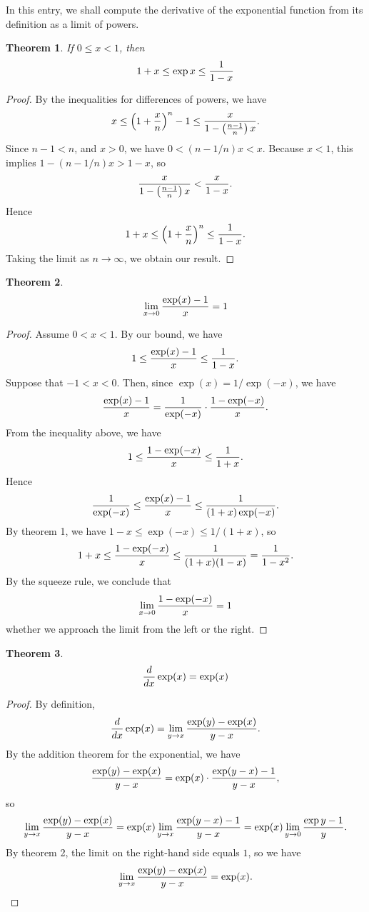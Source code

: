 \documentclass[12pt]{article}
\newtheorem{thm}{Theorem}
\begin{document}
In this entry, we shall compute the derivative of the exponential
function from its definition as a limit of powers.

\begin{thm}
If $0 \le x < 1$, then
\[
1 + x \le \exp x \le {1 \over 1-x}
\]
\end{thm}

\begin{proof}
By the inequalities for differences of powers, we have
\[
x \le 
\left( 1 + {x \over n} \right)^n - 1 \le 
{x \over 1 - \left( {n-1 \over n} \right) x} .
\]
Since $n-1 < n$, and $x > 0$, we have $0 < (n-1 / n) x < x$.  Because
$x < 1$, this implies $1 - (n-1 / n) x > 1 - x$, so
\[
{x \over 1 - \left( {n-1 \over n} \right) x} <
{x \over 1 - x}.
\]
Hence 
\[
1 + x \le \left( 1 + {x \over n} \right)^n \le {1 \over 1 - x}.
\]
Taking the limit as $n \to \infty$, we obtain our result.
\end{proof}

\begin{thm}
\[
\lim_{x \to 0} {\exp (x) - 1 \over x} = 1
\]
\end{thm}

\begin{proof}
Assume $0 < x < 1$.  By our bound, we have
\[
1 \le
{\exp (x) - 1 \over x} \le
{1 \over 1 - x} .
\]
Suppose that $-1 < x < 0$.  Then, since $\exp (x) = 1 / \exp (-x)$, we have
\[
{\exp (x) - 1 \over x} =
{1 \over \exp (-x)} \cdot {1 - \exp (-x) \over x} .
\]
From the inequality above, we have
\[
1 \le
{1 - \exp (-x) \over x} \le
{1 \over 1+x} .
\]
Hence
\[
{1 \over \exp (-x)} \le
{\exp (x) - 1 \over x} \le
{1 \over (1+x) \exp (-x)}.
\]
By theorem 1, we have $1 - x \le \exp (-x) \le 1 / (1 + x)$, so
\[
1+x \le
{1 - \exp (-x) \over x} \le
{1 \over (1 + x)(1-x)} =
{1 \over 1 - x^2} .
\]
By the squeeze rule, we conclude that 
\[
\lim_{x \to 0} {1 - \exp (-x) \over x} = 1 
\]
whether we approach the limit from the left or the right.
\end{proof}

\begin{thm}
\[
{d \over dx} \exp (x) = \exp (x)
\]
\end{thm}

\begin{proof}
By definition,
\[
{d \over dx} \exp (x) = 
\lim_{y \to x} {\exp (y) - \exp (x) \over y - x} .
\]
By the addition theorem for the exponential, we have
\[
{\exp (y) - \exp (x) \over y - x} =
\exp (x) \cdot {\exp (y-x) - 1 \over y - x} ,
\]
so
\[
\lim_{y \to x} {\exp (y) - \exp (x) \over y - x} =
\exp (x) \lim_{y \to x}
{\exp (y-x) - 1 \over y - x} =
\exp (x) \lim_{y \to 0} {\exp y - 1 \over y} .
\]
By theorem 2, the limit on the right-hand side equals $1$, so we have
\[
\lim_{y \to x} {\exp (y) - \exp (x) \over y - x} = \exp (x) .
\]
\end{proof}
\end{document}
